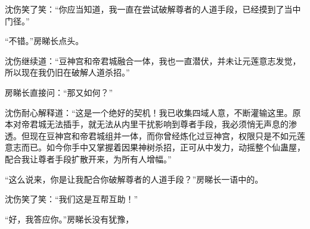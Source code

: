 \begin{this_body}
沈伤笑了笑：“你应当知道，我一直在尝试破解尊者的人道手段，已经摸到了当中门径。”

“不错。”房睇长点头。

沈伤继续道：“豆神宫和帝君城融合一体，我也一直潜伏，并未让元莲意志发觉，所以现在我仍旧在破解人道杀招。”

房睇长直接问：“那又如何？”

沈伤耐心解释道：“这是一个绝好的契机！我已收集四域人意，不断灌输这里。原本对帝君城无法插手，就无法从内里干扰影响到尊者手段，我必须悄无声息的渗透。但现在豆神宫和帝君城组并一体，而你曾经炼化过豆神宫，权限只是不如元莲意志而已。如今你手中又掌握着因果神树杀招，正可从中发力，动摇整个仙蛊屋，配合我让尊者手段扩散开来，为所有人增幅。”

“这么说来，你是让我配合你破解尊者的人道手段？”房睇长一语中的。

沈伤笑了笑：“我们这是互帮互助！”

“好，我答应你。”房睇长没有犹豫，

\end{this_body}

